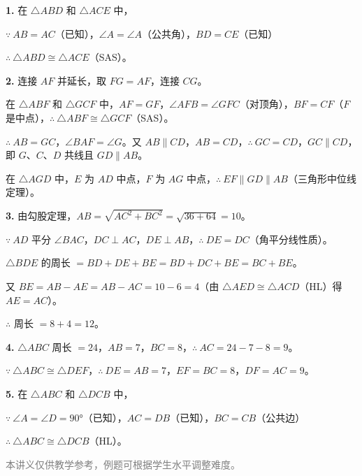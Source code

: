 \documentclass[12pt, a4paper]{ctexart}
\begin{document}
\begin{knowledgebox}[参考答案]
\textbf{1.} 在 $\triangle ABD$ 和 $\triangle ACE$ 中，

$\because\ AB = AC$（已知），$\angle A = \angle A$（公共角），$BD = CE$（已知）

$\therefore\ \triangle ABD \cong \triangle ACE$（SAS）。

\medskip

\textbf{2.} 连接 $AF$ 并延长，取 $FG = AF$，连接 $CG$。

在 $\triangle ABF$ 和 $\triangle GCF$ 中，$AF = GF$，$\angle AFB = \angle GFC$（对顶角），$BF = CF$（$F$ 是中点），$\therefore\ \triangle ABF \cong \triangle GCF$（SAS）。

$\therefore\ AB = GC$，$\angle BAF = \angle G$。又 $AB \parallel CD$，$AB = CD$，$\therefore\ GC = CD$，$GC \parallel CD$，即 $G$、$C$、$D$ 共线且 $GD \parallel AB$。

在 $\triangle AGD$ 中，$E$ 为 $AD$ 中点，$F$ 为 $AG$ 中点，$\therefore\ EF \parallel GD \parallel AB$（三角形中位线定理）。

\medskip

\textbf{3.} 由勾股定理，$AB = \sqrt{AC^2 + BC^2} = \sqrt{36 + 64} = 10$。

$\because\ AD$ 平分 $\angle BAC$，$DC \perp AC$，$DE \perp AB$，$\therefore\ DE = DC$（角平分线性质）。

$\triangle BDE$ 的周长 $= BD + DE + BE = BD + DC + BE = BC + BE$。

又 $BE = AB - AE = AB - AC = 10 - 6 = 4$（由 $\triangle AED \cong \triangle ACD$（HL）得 $AE = AC$）。

$\therefore$ 周长 $= 8 + 4 = 12$。

\medskip

\textbf{4.} $\triangle ABC$ 周长 $= 24$，$AB = 7$，$BC = 8$，$\therefore\ AC = 24 - 7 - 8 = 9$。

$\because\ \triangle ABC \cong \triangle DEF$，$\therefore\ DE = AB = 7$，$EF = BC = 8$，$DF = AC = 9$。

\medskip

\textbf{5.} 在 $\triangle ABC$ 和 $\triangle DCB$ 中，

$\because\ \angle A = \angle D = 90°$（已知），$AC = DB$（已知），$BC = CB$（公共边）

$\therefore\ \triangle ABC \cong \triangle DCB$（HL）。
\end{knowledgebox}

\vfill
\begin{center}
\small\textcolor{gray}{本讲义仅供教学参考，例题可根据学生水平调整难度。}
\end{center}
\end{document}
